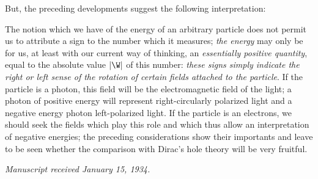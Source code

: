 \documentclass{article}
\renewcommand{\it}[1]{\textit{#1}}
\begin{document}
\begin{multicols}{2}
But, the preceding developments suggest the following interpretation:

The notion which we have of the energy of an arbitrary particle does not permit us to attribute a sign to the number which it measures; \it{the energy} may only be for us, at least with our current way of thinking, an \it{essentially positive quantity}, equal to the absolute value $|\W|$ of this number: \it{these signs simply indicate the right or left sense of the rotation of certain fields attached to the particle}. If the particle is a photon, this field will be the electromagnetic field of the light; a photon of positive energy will represent right-circularly polarized light and a negative energy photon left-polarized light. If the particle is an electrons, we should seek the fields which play this role and which thus allow an interpretation of negative energies; the preceding considerations show their importants and leave to be seen whether the comparison with Dirac's hole theory will be very fruitful.

\it{Manuscript received January 15, 1934.}




\end{multicols}
\end{document}
